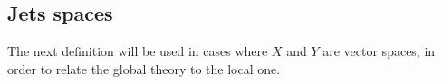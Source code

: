 % 
% 
% 
% 


\subsection{Jets spaces}

The next definition will be used in cases where $X$ and $Y$ are vector spaces,
in order to relate the global theory to the local one.

